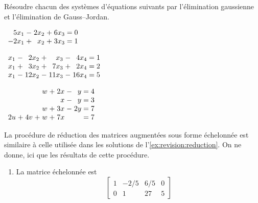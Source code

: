 \enlargethispage{5mm}

\begin{exercice}
  Résoudre chacun des systèmes d'équations suivants par l'élimination
  gaussienne et l'élimination de Gauss--Jordan.
  \begin{enumerate}
    \begin{multicols}{2}
    \item $%
      \begin{array}[t]{*{2}{r@{\;}c@{\;}}r@{\;=\;}r}
        5x_1 &-& 2x_2 &+& 6x_3 & 0 \\
        -2x_1 &+&  x_2 &+& 3x_3 & 1
      \end{array}$
    \item $%
      \begin{array}[t]{*{3}{r@{\;}c@{\;}}r@{\;=\;}r}
        x_1 &-&  2x_2 &+&   x_3 &-&  4x_4 & 1 \\
        x_1 &+&  3x_2 &+&  7x_3 &+&  2x_4 & 2 \\
        x_1 &-& 12x_2 &-& 11x_3 &-& 16x_4 & 5
      \end{array}$
    \end{multicols}
    \begin{multicols}{2}
    \item $%
      \begin{array}[t]{*{4}{r@{\;}c@{\;}}r@{\;=\;}r}
        & &    & &  w &+& 2x &-&  y & 4 \\
        & &    & &    & &  x &-&  y & 3 \\
        & &    & &  w &+& 3x &-& 2y & 7 \\
        2u &+& 4v &+&  w &+& 7x & &    & 7
      \end{array}$
    \end{multicols}
  \end{enumerate}
  \begin{sol}
    La procédure de réduction des matrices augmentées sous forme
    échelonnée est similaire à celle utilisée dans les solutions de
    l'\autoref{ex:revision:reduction}. On ne donne, ici que les
    résultats de cette procédure.
    \begin{enumerate}
    \item La matrice échelonnée est
      \begin{displaymath}
        \begin{bmatrix}
          1 & -2/5 & 6/5 & 0 \\
          0 &    1 &  27 & 5
        \end{bmatrix}
      \end{displaymath}

\end{enumerate}
\end{sol}
\end{exercice}
